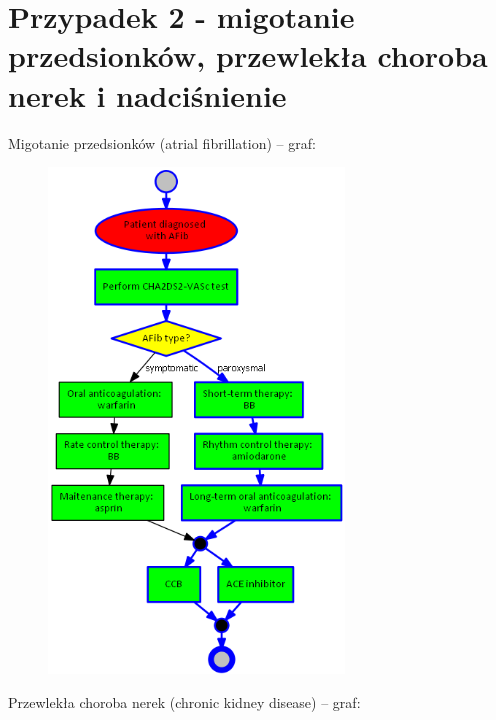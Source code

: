 \section{Przypadek 2 - migotanie przedsionków, przewlekła choroba nerek i nadciśnienie}

Migotanie przedsionków  (atrial fibrillation) – graf:
\begin{figure}[H]
\centering
\includegraphics[width=0.7\textwidth]{img/afib-ver-4.png}
\end{figure}
\newpage
Przewlekła choroba nerek (chronic kidney disease) – graf:
